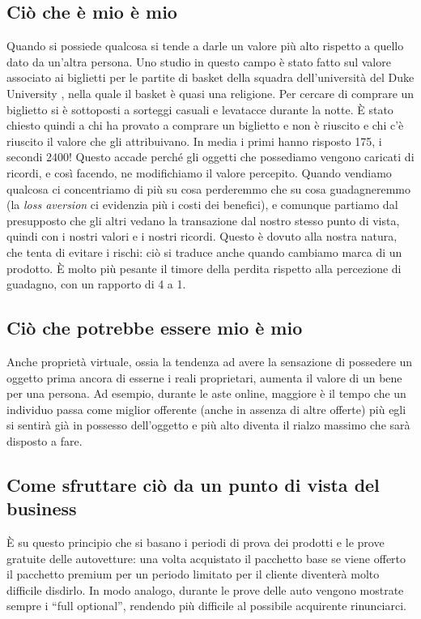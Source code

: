 \subsection{Ciò che è mio è mio}
Quando si possiede qualcosa si tende a darle un valore più alto rispetto a
quello dato da un'altra persona.
Uno studio in questo campo è stato fatto sul valore associato ai biglietti per
le partite di basket della squadra dell'università del Duke University
,
nella quale il basket è quasi una religione. Per
cercare di comprare un biglietto si è sottoposti a sorteggi casuali e levatacce
durante la notte. È stato chiesto quindi a chi ha provato a comprare un
biglietto e non è riuscito e chi c'è riuscito il valore che gli attribuivano.
In media i primi hanno risposto 175\textdollar{}, i secondi 2400\textdollar{}!
Questo accade perché gli oggetti che possediamo vengono caricati di ricordi, e
così facendo, ne modifichiamo il valore percepito. Quando vendiamo qualcosa ci
concentriamo di più su cosa perderemmo che su cosa guadagneremmo (la
\textit{loss aversion} ci evidenzia più i costi dei benefici), e comunque
partiamo dal presupposto che gli altri vedano la transazione dal nostro stesso
punto di vista, quindi con i nostri valori e i nostri ricordi.
Questo è dovuto alla nostra natura, che tenta di evitare i rischi: ciò
si traduce anche quando cambiamo marca di un prodotto.
È molto più pesante il timore della perdita rispetto alla percezione di
guadagno, con un rapporto di 4 a 1.

\subsection{Ciò che potrebbe essere mio è mio}
Anche proprietà virtuale, ossia la tendenza ad avere la sensazione di possedere
un oggetto prima ancora di esserne i reali proprietari, aumenta il valore di un
bene per una persona. Ad esempio, durante le aste online, maggiore è il tempo
che un individuo passa come miglior offerente (anche in assenza di altre
offerte) più egli si sentirà già in possesso dell'oggetto e più alto diventa il
rialzo massimo che sarà disposto a fare.

\subsection{Come sfruttare ciò da un punto di vista del business}
È su questo principio che si basano i periodi di prova dei prodotti e le prove
gratuite delle autovetture: una volta acquistato il pacchetto base se viene
offerto il pacchetto premium per un periodo limitato per il cliente diventerà
molto difficile disdirlo. In modo analogo, durante le prove delle auto vengono
mostrate sempre i ``full optional'', rendendo più difficile al possibile
acquirente rinunciarci.
